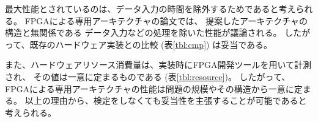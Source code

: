 \documentclass{jsarticle}
\begin{document}
最大性能とされているのは、データ入力の時間を除外するためであると考えられる。
FPGAによる専用アーキテクチャの論文では、 提案したアーキテクチャの構造と無関係である
データ入力などの処理を除いた性能が議論される。
したがって、既存のハードウェア実装との比較 (表\ref{tbl:cmp}) は妥当である。

また、ハードウェアリソース消費量は、実装時にFPGA開発ツールを用いて計測され、
その値は一意に定まるものである (表\ref{tbl:resource})。
したがって、FPGAによる専用アーキテクチャの性能は問題の規模やその構造から一意に定まる。
以上の理由から、検定をしなくても妥当性を主張することが可能であると考えられる。
\end{document}
